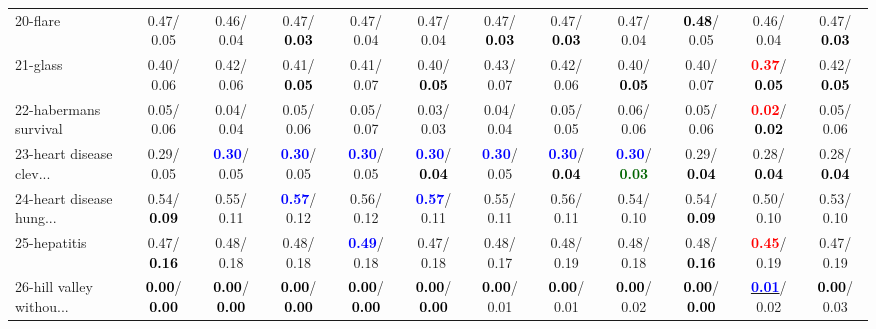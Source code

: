 \begin{table}[h]
\begin{center}
{\begin{tabular}{lc|c|c|c|c|c|c|c|c|c|c}
20-flare &   0.47/  0.05 &   0.46/  0.04 &   0.47/\textcolor{black}{\textbf{  0.03}} &   0.47/  0.04 &   0.47/  0.04 &   0.47/\textcolor{black}{\textbf{  0.03}} &   0.47/\textcolor{black}{\textbf{  0.03}} &   0.47/  0.04 & \textcolor{black}{\textbf{  0.48}}/  0.05 &   0.46/  0.04 &   0.47/\textcolor{black}{\textbf{  0.03}} \\
21-glass &   0.40/  0.06 &   0.42/  0.06 &   0.41/\textcolor{black}{\textbf{  0.05}} &   0.41/  0.07 &   0.40/\textcolor{black}{\textbf{  0.05}} &   0.43/  0.07 &   0.42/  0.06 &   0.40/\textcolor{black}{\textbf{  0.05}} &   0.40/  0.07 & \textcolor{red}{\textbf{  0.37}}/\textcolor{black}{\textbf{  0.05}} &   0.42/\textcolor{black}{\textbf{  0.05}} \\ \hline
22-habermans survival &   0.05/  0.06 &   0.04/  0.04 &   0.05/  0.06 &   0.05/  0.07 &   0.03/  0.03 &   0.04/  0.04 &   0.05/  0.05 &   0.06/  0.06 &   0.05/  0.06 & \textcolor{red}{\textbf{  0.02}}/\textcolor{black}{\textbf{  0.02}} &   0.05/  0.06 \\
23-heart disease clev... &   0.29/  0.05 & \textcolor{blue}{\textbf{  0.30}}/  0.05 & \textcolor{blue}{\textbf{  0.30}}/  0.05 & \textcolor{blue}{\textbf{  0.30}}/  0.05 & \textcolor{blue}{\textbf{  0.30}}/\textcolor{black}{\textbf{  0.04}} & \textcolor{blue}{\textbf{  0.30}}/  0.05 & \textcolor{blue}{\textbf{  0.30}}/\textcolor{black}{\textbf{  0.04}} & \textcolor{blue}{\textbf{  0.30}}/\textcolor{darkgreen}{\textbf{  0.03}} &   0.29/\textcolor{black}{\textbf{  0.04}} &   0.28/\textcolor{black}{\textbf{  0.04}} &   0.28/\textcolor{black}{\textbf{  0.04}} \\
24-heart disease hung... &   0.54/\textcolor{black}{\textbf{  0.09}} &   0.55/  0.11 & \textcolor{blue}{\textbf{  0.57}}/  0.12 &   0.56/  0.12 & \textcolor{blue}{\textbf{  0.57}}/  0.11 &   0.55/  0.11 &   0.56/  0.11 &   0.54/  0.10 &   0.54/\textcolor{black}{\textbf{  0.09}} &   0.50/  0.10 &   0.53/  0.10 \\
25-hepatitis &   0.47/\textcolor{black}{\textbf{  0.16}} &   0.48/  0.18 &   0.48/  0.18 & \textcolor{blue}{\textbf{  0.49}}/  0.18 &   0.47/  0.18 &   0.48/  0.17 &   0.48/  0.19 &   0.48/  0.18 &   0.48/\textcolor{black}{\textbf{  0.16}} & \textcolor{red}{\textbf{  0.45}}/  0.19 &   0.47/  0.19 \\
26-hill valley withou... & \textcolor{black}{\textbf{  0.00}}/\textcolor{black}{\textbf{  0.00}} & \textcolor{black}{\textbf{  0.00}}/\textcolor{black}{\textbf{  0.00}} & \textcolor{black}{\textbf{  0.00}}/\textcolor{black}{\textbf{  0.00}} & \textcolor{black}{\textbf{  0.00}}/\textcolor{black}{\textbf{  0.00}} & \textcolor{black}{\textbf{  0.00}}/\textcolor{black}{\textbf{  0.00}} & \textcolor{black}{\textbf{  0.00}}/  0.01 & \textcolor{black}{\textbf{  0.00}}/  0.01 & \textcolor{black}{\textbf{  0.00}}/  0.02 & \textcolor{black}{\textbf{  0.00}}/\textcolor{black}{\textbf{  0.00}} & \underline{\textcolor{blue}{\textbf{  0.01}}}/  0.02 & \textcolor{black}{\textbf{  0.00}}/  0.03 \\

\end{tabular}}
\end{center}
\end{table}
